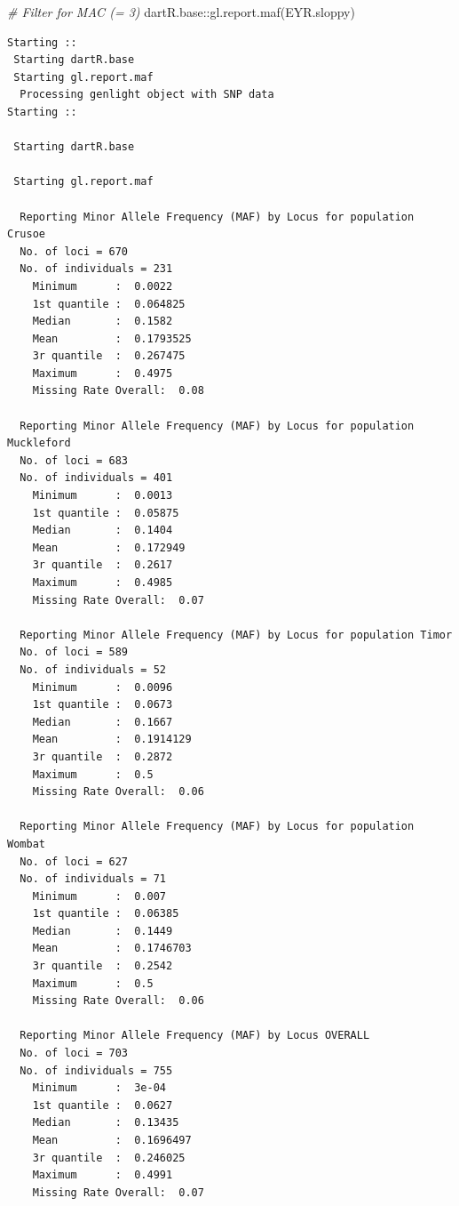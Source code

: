\documentclass[
  letterpaper,
  DIV=11,
  numbers=noendperiod]{scrreprt}
\newenvironment{Shaded}{\begin{snugshade}}{\end{snugshade}}
\newcommand{\CommentTok}[1]{\textcolor[rgb]{0.38,0.63,0.69}{\textit{#1}}}
\newcommand{\FunctionTok}[1]{\textcolor[rgb]{0.02,0.16,0.49}{#1}}
\newcommand{\NormalTok}[1]{\textcolor[rgb]{0.00,0.44,0.13}{#1}}
\newcommand{\SpecialCharTok}[1]{\textcolor[rgb]{0.25,0.44,0.63}{#1}}
\begin{document}
\begin{Shaded}
\begin{Highlighting}[]
\CommentTok{\# Filter for MAC (= 3)}
\NormalTok{dartR.base}\SpecialCharTok{::}\FunctionTok{gl.report.maf}\NormalTok{(EYR.sloppy)}
\end{Highlighting}
\end{Shaded}

\begin{verbatim}
Starting :: 
 Starting dartR.base 
 Starting gl.report.maf 
  Processing genlight object with SNP data
Starting :: 

 Starting dartR.base 

 Starting gl.report.maf 

  Reporting Minor Allele Frequency (MAF) by Locus for population Crusoe 
  No. of loci = 670 
  No. of individuals = 231 
    Minimum      :  0.0022 
    1st quantile :  0.064825 
    Median       :  0.1582 
    Mean         :  0.1793525 
    3r quantile  :  0.267475 
    Maximum      :  0.4975 
    Missing Rate Overall:  0.08 

  Reporting Minor Allele Frequency (MAF) by Locus for population Muckleford 
  No. of loci = 683 
  No. of individuals = 401 
    Minimum      :  0.0013 
    1st quantile :  0.05875 
    Median       :  0.1404 
    Mean         :  0.172949 
    3r quantile  :  0.2617 
    Maximum      :  0.4985 
    Missing Rate Overall:  0.07 

  Reporting Minor Allele Frequency (MAF) by Locus for population Timor 
  No. of loci = 589 
  No. of individuals = 52 
    Minimum      :  0.0096 
    1st quantile :  0.0673 
    Median       :  0.1667 
    Mean         :  0.1914129 
    3r quantile  :  0.2872 
    Maximum      :  0.5 
    Missing Rate Overall:  0.06 

  Reporting Minor Allele Frequency (MAF) by Locus for population Wombat 
  No. of loci = 627 
  No. of individuals = 71 
    Minimum      :  0.007 
    1st quantile :  0.06385 
    Median       :  0.1449 
    Mean         :  0.1746703 
    3r quantile  :  0.2542 
    Maximum      :  0.5 
    Missing Rate Overall:  0.06 

  Reporting Minor Allele Frequency (MAF) by Locus OVERALL
  No. of loci = 703 
  No. of individuals = 755 
    Minimum      :  3e-04 
    1st quantile :  0.0627 
    Median       :  0.13435 
    Mean         :  0.1696497 
    3r quantile  :  0.246025 
    Maximum      :  0.4991 
    Missing Rate Overall:  0.07 
\end{verbatim}
\end{document}
